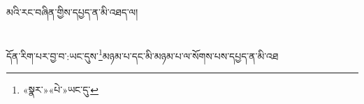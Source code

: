 མའི་རང་བཞིན་གྱིས་དཔྱད་ན་མི་འཐད་ལ།\chapter{ }དོན་རིག་པར་བྱ་བ་:ཡང་དུས་\footnote{«སྣར་»«པེ་»ཡང་དུ་}མཉམ་པ་དང་མི་མཉམ་པ་ལ་སོགས་པས་དཔྱད་ན་མི་འཐ